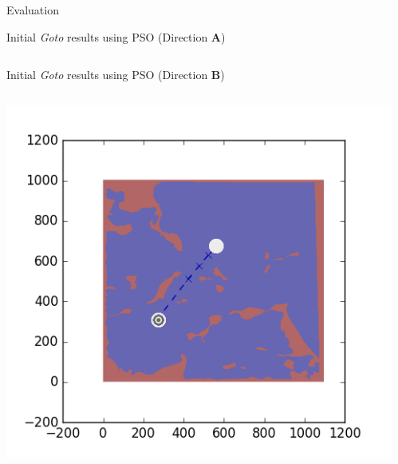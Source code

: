 \documentclass[9pt]{beamer}
\begin{document}
\begin{frame}{Evaluation}
\begin{block}{Initial \textit{Goto} results using PSO (Direction \textbf{A})}
\begin{columns}
\begin{column}{0.25\textwidth}
\begin{center}
                \end{center}
            \end{column}
        \end{columns}
    \end{block}
    \begin{block}{Initial \textit{Goto} results using PSO (Direction \textbf{B})}
        \begin{columns}
            \begin{column}{0.25\textwidth}
                \begin{center}
                        \includegraphics[width=\textwidth,trim={2cm 2cm 2cm 2cm},clip]{img/EXP3RG_PathAb_-1_-1_0_0.png}
                \end{center}
            \end{column}
            \begin{column}{0.25\textwidth}
                \begin{center}

\end{center}
\end{column}
\end{columns}
\end{block}
\end{frame}
\end{document}

